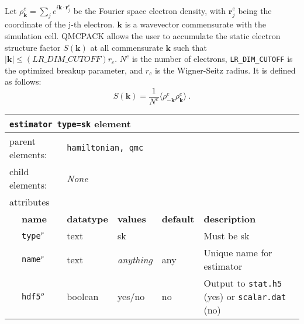 Let $\rho^e_{\mathbf{k}}=\sum_j e^{i \mathbf{k}\cdot\mathbf{r}_j^e}$ be the Fourier space electron density, with $\mathbf{r}^e_j$ being the coordinate of the j-th electron.  $\mathbf{k}$ is a wavevector commensurate with the simulation cell.  QMCPACK allows the user to accumulate the static electron structure factor $S(\mathbf{k})$ at all commensurate $\mathbf{k}$ such that $|\mathbf{k}| \leq (LR\_DIM\_CUTOFF) r_c$.  $N^e$ is the number of electrons, \texttt{LR\_DIM\_CUTOFF} is the optimized breakup parameter, and $r_c$ is the Wigner-Seitz radius.  It is defined as follows:
\begin{equation}
S(\mathbf{k}) = \frac{1}{N^e}\langle \rho^e_{-\mathbf{k}} \rho^e_{\mathbf{k}} \rangle\:.
\end{equation}


\FloatBarrier
\begin{table}[h]
\begin{center}
\begin{tabularx}{\textwidth}{l l l l l X }
\hline
\multicolumn{6}{l}{\texttt{estimator type=sk} element} \\
\hline
\multicolumn{2}{l}{parent elements:} & \multicolumn{4}{l}{\texttt{hamiltonian, qmc}}\\
\multicolumn{2}{l}{child  elements:} & \multicolumn{4}{l}{\textit{None}}\\
\multicolumn{2}{l}{attributes}  & \multicolumn{4}{l}{}\\
   & \bfseries name       & \bfseries datatype & \bfseries values  & \bfseries default   & \bfseries description \\
   & \texttt{type}$^r$    &  text              & sk      &                     & Must be sk       \\
   & \texttt{name}$^r$    &  text              & \textit{anything} & any                 & Unique name for estimator \\
   & \texttt{hdf5}$^o$    &  boolean           & yes/no            & no                  & Output to \texttt{stat.h5} (yes) or \texttt{scalar.dat} (no) \\
  \hline
\end{tabularx}
\end{center}
\end{table}
\FloatBarrier

